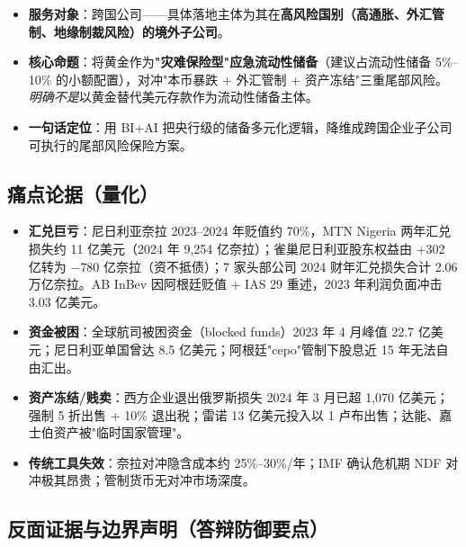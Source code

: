 \documentclass[UTF8,12pt]{ctexart}
\begin{document}
\begin{itemize}
\item \textbf{服务对象}：跨国公司——具体落地主体为其在\textbf{高风险国别（高通胀、外汇管制、地缘制裁风险）的境外子公司}。
\item \textbf{核心命题}：将黄金作为\textbf{"灾难保险型"应急流动性储备}（建议占流动性储备 5\%--10\% 的小额配置），对冲"本币暴跌 + 外汇管制 + 资产冻结"三重尾部风险。\emph{明确不是}以黄金替代美元存款作为流动性储备主体。
\item \textbf{一句话定位}：用 BI+AI 把央行级的储备多元化逻辑，降维成跨国企业子公司可执行的尾部风险保险方案。
\end{itemize}

\subsection{痛点论据（量化）}

\begin{itemize}
\item \textbf{汇兑巨亏}：尼日利亚奈拉 2023--2024 年贬值约 70\%，MTN Nigeria 两年汇兑损失约 11 亿美元（2024 年 9{,}254 亿奈拉）；雀巢尼日利亚股东权益由 +302 亿转为 $-780$ 亿奈拉（资不抵债）；7 家头部公司 2024 财年汇兑损失合计 2.06 万亿奈拉。AB InBev 因阿根廷贬值 + IAS 29 重述，2023 年利润负面冲击 3.03 亿美元。
\item \textbf{资金被困}：全球航司被困资金（blocked funds）2023 年 4 月峰值 22.7 亿美元；尼日利亚单国曾达 8.5 亿美元；阿根廷"cepo"管制下股息近 15 年无法自由汇出。
\item \textbf{资产冻结/贱卖}：西方企业退出俄罗斯损失 2024 年 3 月已超 1{,}070 亿美元；强制 5 折出售 + 10\% 退出税；雷诺 13 亿美元投入以 1 卢布出售；达能、嘉士伯资产被"临时国家管理"。
\item \textbf{传统工具失效}：奈拉对冲隐含成本约 25\%--30\%/年；IMF 确认危机期 NDF 对冲极其昂贵；管制货币无对冲市场深度。
\end{itemize}

\subsection{反面证据与边界声明（答辩防御要点）}
\end{document}
